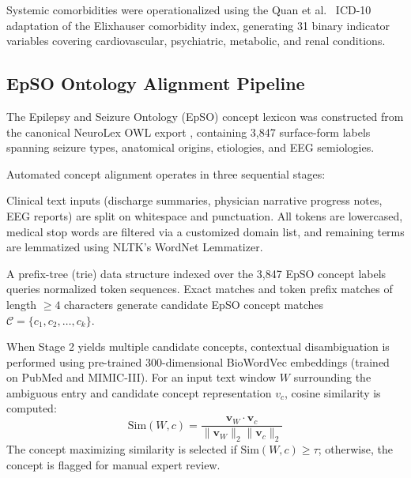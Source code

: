 \documentclass[11pt,a4paper]{article}
\begin{document}
Systemic comorbidities were operationalized using the Quan et al.\ \cite{quan2005coding} ICD-10 adaptation of the Elixhauser comorbidity index, generating 31 binary indicator variables covering cardiovascular, psychiatric, metabolic, and renal conditions.

\subsection{EpSO Ontology Alignment Pipeline}
The Epilepsy and Seizure Ontology (EpSO) \cite{buccella2011ontology} concept lexicon was constructed from the canonical NeuroLex OWL export \cite{larson2013neurolex}, containing 3,847 surface-form labels spanning seizure types, anatomical origins, etiologies, and EEG semiologies.

Automated concept alignment operates in three sequential stages:
\begin{description}[leftmargin=*, style=nextline]
    \item[Stage 1: Tokenization and Text Normalization] Clinical text inputs (discharge summaries, physician narrative progress notes, EEG reports) are split on whitespace and punctuation. All tokens are lowercased, medical stop words are filtered via a customized domain list, and remaining terms are lemmatized using NLTK's WordNet Lemmatizer.
    \item[Stage 2: Prefix-Tree (Trie) Lexicon Matching] A prefix-tree (trie) data structure indexed over the 3,847 EpSO concept labels queries normalized token sequences. Exact matches and token prefix matches of length $\ge 4$ characters generate candidate EpSO concept matches $\mathcal{C} = \{c_1, c_2, \dots, c_k\}$.
    \item[Stage 3: BioWordVec Contextual Disambiguation] When Stage 2 yields multiple candidate concepts, contextual disambiguation is performed using pre-trained 300-dimensional BioWordVec embeddings \cite{zhang2019biowordvec} (trained on PubMed and MIMIC-III). For an input text window $W$ surrounding the ambiguous entry and candidate concept representation $v_c$, cosine similarity is computed:
    \begin{equation}
        \text{Sim}(W, c) = \frac{\mathbf{v}_W \cdot \mathbf{v}_c}{\|\mathbf{v}_W\|_2 \|\mathbf{v}_c\|_2}
    \end{equation}
    The concept maximizing similarity is selected if $\text{Sim}(W, c) \ge \tau$; otherwise, the concept is flagged for manual expert review.
\end{description}
\end{document}
